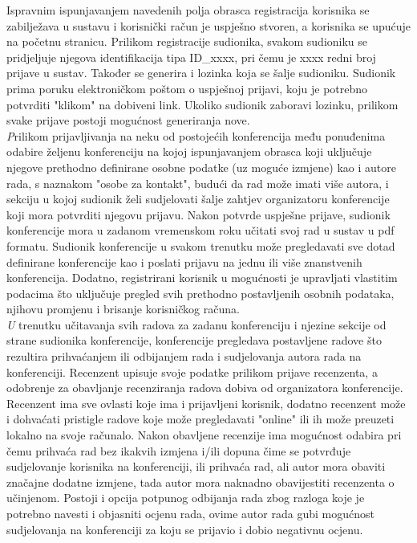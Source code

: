		  Ispravnim ispunjavanjem navedenih polja obrasca registracija korisnika se zabilježava u sustavu i korisnički račun je uspješno stvoren, a korisnika se upućuje na početnu stranicu. Prilikom registracije sudionika, svakom sudioniku se pridjeljuje njegova identifikacija tipa ID\_xxxx, pri čemu je xxxx redni broj prijave u sustav. Također se generira i lozinka koja se šalje sudioniku. Sudionik prima poruku elektroničkom poštom o uspješnoj prijavi, koju je potrebno potvrditi "klikom" na dobiveni link. Ukoliko sudionik zaboravi lozinku, prilikom svake prijave postoji mogućnost generiranja nove.\\ 
		
		\textit Prilikom prijavljivanja na neku od postojećih konferencija  među ponuđenima odabire željenu konferenciju na kojoj ispunjavanjem obrasca koji uključuje njegove prethodno definirane osobne podatke (uz moguće izmjene) kao i autore rada, s naznakom "osobe za kontakt", budući da rad može imati više autora, i sekciju u kojoj sudionik želi sudjelovati šalje zahtjev organizatoru konferencije koji mora potvrditi njegovu prijavu. Nakon potvrde uspješne prijave, sudionik konferencije mora u zadanom vremenskom roku učitati svoj rad u sustav u pdf formatu. Sudionik konferencije u svakom trenutku može pregledavati sve dotad definirane konferencije kao i poslati prijavu na jednu ili više znanstvenih konferencija. Dodatno, registrirani korisnik u mogućnosti je upravljati vlastitim podacima što uključuje pregled svih prethodno postavljenih osobnih podataka, njihovu promjenu i brisanje korisničkog računa. \\
		
		\textit U trenutku učitavanja svih radova za zadanu konferenciju i njezine sekcije od strane sudionika konferencije,  konferencije pregledava postavljene radove što rezultira prihvaćanjem ili odbijanjem rada i sudjelovanja autora rada na konferenciji. Recenzent upisuje svoje podatke prilikom prijave recenzenta, a odobrenje za obavljanje recenziranja radova dobiva od organizatora konferencije. Recenzent ima sve ovlasti koje ima i prijavljeni korisnik, dodatno recenzent može i dohvaćati pristigle radove koje može pregledavati "online" ili ih može preuzeti lokalno na svoje računalo. Nakon obavljene recenzije ima mogućnost odabira pri čemu prihvaća rad bez ikakvih izmjena i/ili dopuna čime se potvrđuje sudjelovanje korisnika na konferenciji, ili prihvaća rad, ali autor mora obaviti značajne dodatne izmjene, tada autor mora naknadno obavijestiti recenzenta o učinjenom. Postoji i opcija potpunog odbijanja rada zbog razloga koje je potrebno navesti i objasniti ocjenu rada, ovime autor rada gubi mogućnost sudjelovanja na konferenciji za koju se prijavio i dobio negativnu ocjenu.\\     
		
